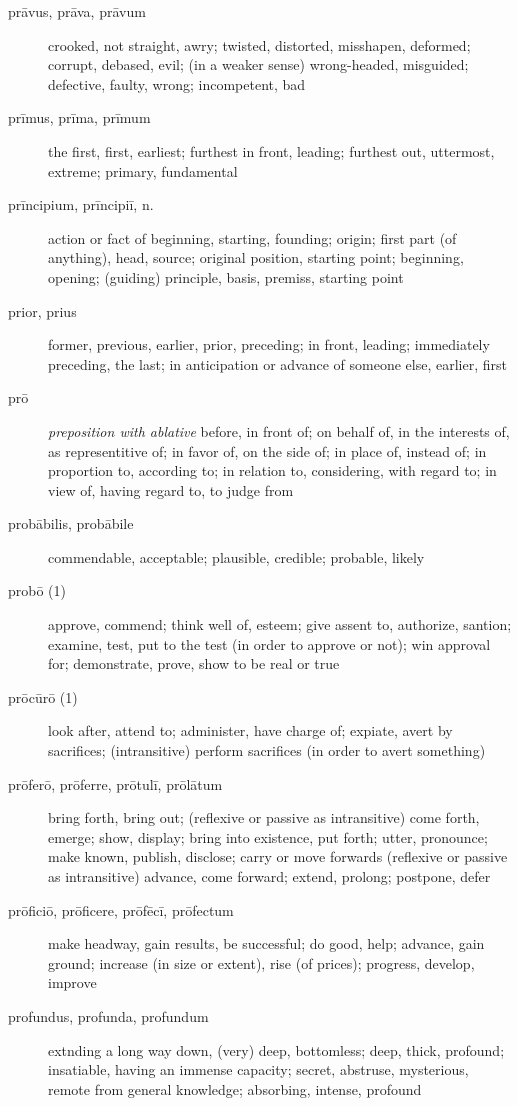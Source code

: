 \begin{description}
    \item[prāvus, prāva, prāvum] crooked, not straight, awry; twisted, distorted, misshapen, deformed; corrupt, debased, evil; (in a weaker sense) wrong-headed, misguided; defective, faulty, wrong; incompetent, bad
    \item[prīmus, prīma, prīmum] \marginnote{*}the first, first, earliest; furthest in front, leading; furthest out, uttermost, extreme; primary, fundamental
    \item[prīncipium, prīncipiī, n.] \marginnote{*}action or fact of beginning, starting, founding; origin; first part (of anything), head, source; original position, starting point; beginning, opening; (guiding) principle, basis, premiss, starting point
    \item[prior, prius] \marginnote{*}former, previous, earlier, prior, preceding; in front, leading; immediately preceding, the last; in anticipation or advance of someone else, earlier, first
    \item[prō] \marginnote{*}\textit{preposition with ablative} before, in front of; on behalf of, in the interests of, as representitive of; in favor of, on the side of; in place of, instead of; in proportion to, according to; in relation to, considering, with regard to; in view of, having regard to, to judge from
    \item[probābilis, probābile] commendable, acceptable; plausible, credible; probable, likely
    \item[probō (1)] \marginnote{*}approve, commend; think well of, esteem; give assent to, authorize, santion; examine, test, put to the test (in order to approve or not); win approval for; demonstrate, prove, show to be real or true
    \item[prōcūrō (1)] look after, attend to; administer, have charge of; expiate, avert by sacrifices; (intransitive) perform sacrifices (in order to avert something)
    \item[prōferō, prōferre, prōtulī, prōlātum] bring forth, bring out; (reflexive or passive as intransitive) come forth, emerge; show, display; bring into existence, put forth; utter, pronounce; make known, publish, disclose; carry or move forwards (reflexive or passive as intransitive) advance, come forward; extend, prolong; postpone, defer
    \item[prōficiō, prōficere, prōfēcī, prōfectum] make headway, gain results, be successful; do good, help; advance, gain ground; increase (in size or extent), rise (of prices); progress, develop, improve
    \item[profundus, profunda, profundum] extnding a long way down, (very) deep, bottomless; deep, thick, profound; insatiable, having an immense capacity; secret, abstruse, mysterious, remote from general knowledge; absorbing, intense, profound

\end{description}

